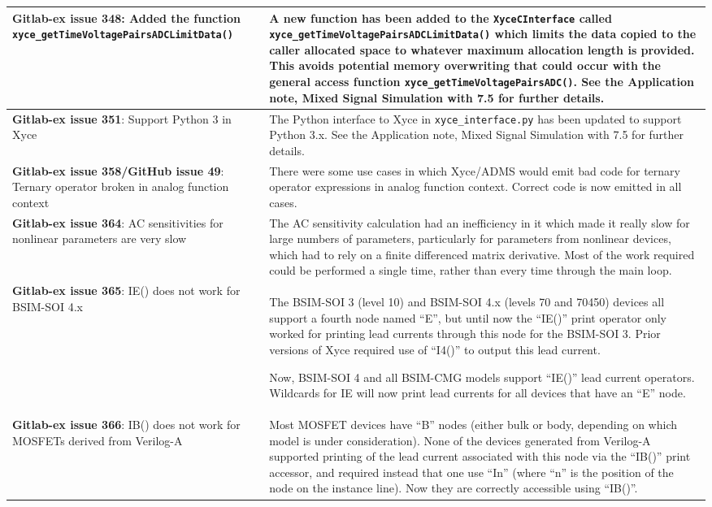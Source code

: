 {\begin{longtable}[h] {>{\raggedright\small}m{2in}|>{\raggedright\let\\\tabularnewline\small}m{3.5in}}
\textbf{Gitlab-ex issue 348}:  Added the function \texttt{xyce\_getTimeVoltagePairs\-ADCLimitData()}  &
  A new function has been added to the \texttt{XyceCInterface}
  called \texttt{xyce\_getTimeVoltagePairsADCLimitData()} which limits
  the data copied to the caller allocated space to whatever maximum
  allocation length is provided.  This avoids potential memory
  overwriting that could occur with the general access
  function \texttt{xyce\_getTimeVoltagePairsADC()}.  See the
  Application note, Mixed Signal Simulation with \Xyce{} 7.5 for
  further details.  \\ \hline

\textbf{Gitlab-ex issue 351}: Support Python 3 in Xyce &
  The Python interface to Xyce in \texttt{xyce\_interface.py}
  has been updated to support Python 3.x.  See the Application note,
  Mixed Signal Simulation with \Xyce{} 7.5 for further details.  \\ \hline

\textbf{Gitlab-ex issue 358/GitHub issue 49}: Ternary operator broken in
analog function context & There were some use cases in which Xyce/ADMS
would emit bad code for ternary operator expressions in analog
function context.  Correct code is now emitted in all
cases.  \\ \hline

\textbf{Gitlab-ex issue 364}:  AC sensitivities for nonlinear parameters are very slow &
 The AC sensitivity calculation had an inefficiency in it which made
 it really slow for large numbers of parameters, particularly for
 parameters from nonlinear devices, which had to rely on a finite
 differenced matrix derivative.  Most of the work required could be
 performed a single time, rather than every time through the main
 loop.  \\ \hline

\textbf{Gitlab-ex issue 365}: IE() does not work for BSIM-SOI 4.x
& The BSIM-SOI 3 (level 10) and BSIM-SOI 4.x (levels 70 and 70450)
devices all support a fourth node named ``E'', but until now the
``IE()'' print operator only worked for printing lead currents through
this node for the BSIM-SOI 3.  Prior versions of Xyce required use of
``I4()'' to output this lead current.

Now, BSIM-SOI 4 and all BSIM-CMG models support ``IE()'' lead current
operators.  Wildcards for IE will now print lead currents for all
devices that have an ``E'' node. \\ \hline

\textbf{Gitlab-ex issue 366}: IB() does not work for MOSFETs derived from Verilog-A
& Most MOSFET devices have ``B'' nodes (either bulk or body, depending
on which model is under consideration).  None of the devices generated
from Verilog-A supported printing of the lead current associated with
this node via the ``IB()'' print accessor, and required instead that
one use ``In'' (where ``n'' is the position of the node on the
instance line).  Now they are correctly accessible using ``IB()''. \\
\hline


\end{longtable}}
